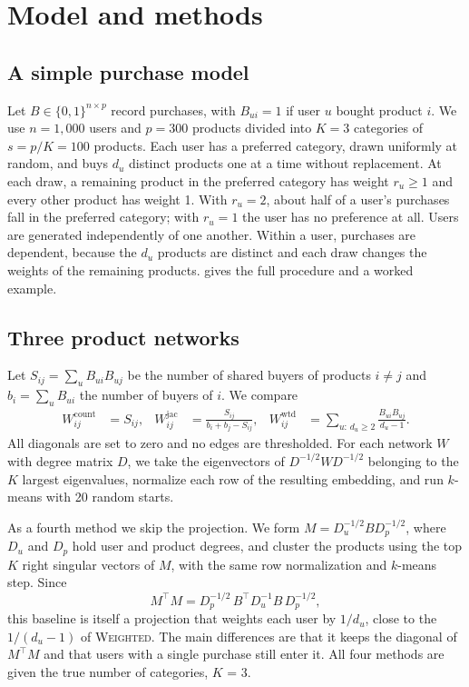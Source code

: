 \documentclass[12pt]{article}
\newcommand{\Wtd}{\textsc{Weighted}}
\begin{document}
\section{Model and methods}

\subsection{A simple purchase model}

Let $B\in\{0,1\}^{n\times p}$ record purchases, with $B_{ui}=1$ if user $u$ bought product $i$. We use $n=1{,}000$ users and $p=300$ products divided into $K=3$ categories of $s=p/K=100$ products. Each user has a preferred category, drawn uniformly at random, and buys $d_u$ distinct products one at a time without replacement. At each draw, a remaining product in the preferred category has weight $r_u\ge 1$ and every other product has weight 1. With $r_u=2$, about half of a user's purchases fall in the preferred category; with $r_u=1$ the user has no preference at all. Users are generated independently of one another. Within a user, purchases are dependent, because the $d_u$ products are distinct and each draw changes the weights of the remaining products.  gives the full procedure and a worked example.

\subsection{Three product networks}

Let $S_{ij}=\sum_u B_{ui}B_{uj}$ be the number of shared buyers of products $i\ne j$ and $b_i=\sum_u B_{ui}$ the number of buyers of $i$. We compare
\begin{align*}
  W^{\text{count}}_{ij} &= S_{ij}, &
  W^{\text{jac}}_{ij} &= \frac{S_{ij}}{b_i+b_j-S_{ij}}, &
  W^{\text{wtd}}_{ij} &= \sum_{u:\,d_u\ge 2}\frac{B_{ui}B_{uj}}{d_u-1}.
\end{align*}
All diagonals are set to zero and no edges are thresholded. For each network $W$ with degree matrix $D$, we take the eigenvectors of $D^{-1/2}WD^{-1/2}$ belonging to the $K$ largest eigenvalues, normalize each row of the resulting embedding, and run $k$-means with 20 random starts.

As a fourth method we skip the projection. We form $M=D_u^{-1/2}BD_p^{-1/2}$, where $D_u$ and $D_p$ hold user and product degrees, and cluster the products using the top $K$ right singular vectors of $M$, with the same row normalization and $k$-means step. Since
\begin{equation}
  M^\top M = D_p^{-1/2}\,B^\top D_u^{-1} B\, D_p^{-1/2},
  \label{eq:svd}
\end{equation}
this baseline is itself a projection that weights each user by $1/d_u$, close to the $1/(d_u-1)$ of \Wtd. The main differences are that it keeps the diagonal of $M^\top M$ and that users with a single purchase still enter it. All four methods are given the true number of categories, $K$ = 3.
\end{document}
